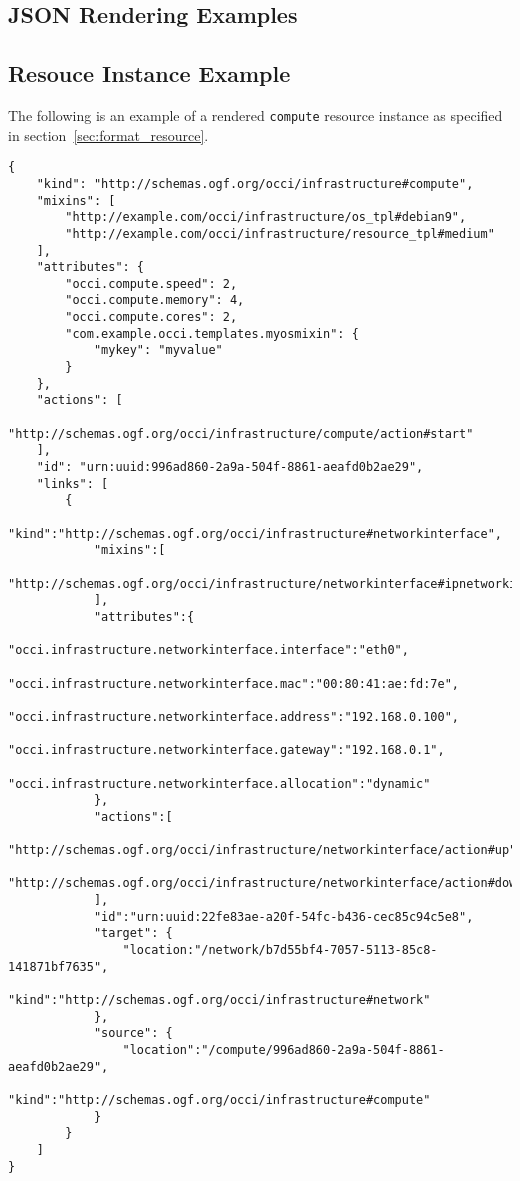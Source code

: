 \documentclass[10pt,a4paper]{article}
\begin{document}
\clearpage
\begin{appendices}

\lstset{
   language=json,
   basicstyle=\footnotesize,
   xleftmargin=0.0cm
}

\section{JSON Rendering Examples}
\subsection{Resouce Instance Example}
\label{resouce_instance_rendering_example}

The following is an example of a rendered \texttt{compute} resource instance as specified in section~\ref{sec:format_resource}.

\begin{lstlisting}
{
    "kind": "http://schemas.ogf.org/occi/infrastructure#compute",
    "mixins": [
        "http://example.com/occi/infrastructure/os_tpl#debian9",
        "http://example.com/occi/infrastructure/resource_tpl#medium"
    ],
    "attributes": {
        "occi.compute.speed": 2,
        "occi.compute.memory": 4,
        "occi.compute.cores": 2,
        "com.example.occi.templates.myosmixin": {
            "mykey": "myvalue"
        }
    },
    "actions": [
        "http://schemas.ogf.org/occi/infrastructure/compute/action#start"
    ],
    "id": "urn:uuid:996ad860-2a9a-504f-8861-aeafd0b2ae29",
    "links": [
        {
            "kind":"http://schemas.ogf.org/occi/infrastructure#networkinterface",
            "mixins":[
                "http://schemas.ogf.org/occi/infrastructure/networkinterface#ipnetworkinterface"
            ],
            "attributes":{
                "occi.infrastructure.networkinterface.interface":"eth0",
                "occi.infrastructure.networkinterface.mac":"00:80:41:ae:fd:7e",
                "occi.infrastructure.networkinterface.address":"192.168.0.100",
                "occi.infrastructure.networkinterface.gateway":"192.168.0.1",
                "occi.infrastructure.networkinterface.allocation":"dynamic"
            },
            "actions":[
                "http://schemas.ogf.org/occi/infrastructure/networkinterface/action#up",
                "http://schemas.ogf.org/occi/infrastructure/networkinterface/action#down"
            ],
            "id":"urn:uuid:22fe83ae-a20f-54fc-b436-cec85c94c5e8",
            "target": {
                "location:"/network/b7d55bf4-7057-5113-85c8-141871bf7635",
                "kind":"http://schemas.ogf.org/occi/infrastructure#network"
            },
            "source": {
                "location":"/compute/996ad860-2a9a-504f-8861-aeafd0b2ae29",
                "kind":"http://schemas.ogf.org/occi/infrastructure#compute"
            }
        }
    ]
}
\end{lstlisting}


\end{appendices}
\end{document}
